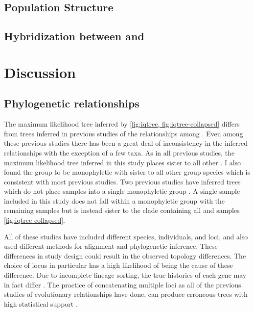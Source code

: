 \subsection{Population Structure}

\subsection{Hybridization between \fowl and \wood}


\section{Discussion}

\subsection{Phylogenetic relationships}
The maximum likelihood tree inferred by \iqtree \cref{fig:iqtree, fig:iqtree-collapsed} 
differs from trees inferred in previous studies of the relationships 
among \anaxyrus \parencite{fontenot2011,graybeal1997,masta2002,pramuk2007,pyron2011,portik2023}.
Even among these previous studies there has been a great deal of inconsistency in
the inferred relationships with the exception of a few taxa. 
As in all previous studies, the maximum likelihood tree inferred in this 
study places \punctatus sister to all other \anaxyrus.
I also found the \americaus group to be monophyletic with \microscaphus sister  
to all other \americanus group species which is consistent with most previous studies.
Two previous studies have inferred trees which do not place \fowleri samples
into a single monophyletic group \parencite{masta2002,fontenot2011}.
A single \fowl sample included in this study does not fall within a monophyletic 
group with the remaining \fowl samples but is instead sister to the clade 
containing all \fowl and \wood samples \cref{fig:iqtree-collapsed}.

All of these studies have included different species, individuals, and loci, and 
also used different methods for alignment and phylogenetic inference. 
These differences in study design could result in the observed topology differences. 
The choice of locus in particular has a high likelihood of being the cause of these difference. 
Due to incomplete lineage sorting, the true histories of each gene may in fact differ \parencite{kingman1982}. 
The practice of concatenating multiple loci as all of the previous studies of
\anaxyrus evolutionary relationships have done, can produce erroneous trees  
with high statistical support \parencite{kubatko2007}.

